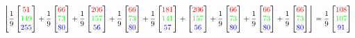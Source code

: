 \documentclass[a4paper, 11pt]{article}
\begin{document}
$$
\left\lfloor
\frac{1}{9}
\begin{bmatrix}
    \textcolor{red}{51} \\ \textcolor{green}{149} \\ \textcolor{blue}{255}
\end{bmatrix}+
\frac{1}{9}
\begin{bmatrix}
    \textcolor{red}{66} \\ \textcolor{green}{73} \\ \textcolor{blue}{80}
\end{bmatrix} +
\frac{1}{9}
\begin{bmatrix}
    \textcolor{red}{206} \\ \textcolor{green}{157} \\ \textcolor{blue}{56}
\end{bmatrix} +
\frac{1}{9}
\begin{bmatrix}
    \textcolor{red}{66} \\ \textcolor{green}{73} \\ \textcolor{blue}{80}
\end{bmatrix} +
\frac{1}{9}
\begin{bmatrix}
    \textcolor{red}{181} \\ \textcolor{green}{141} \\ \textcolor{blue}{57}
\end{bmatrix} +
\begin{bmatrix}
    \textcolor{red}{206} \\ \textcolor{green}{157} \\ \textcolor{blue}{56}
\end{bmatrix} +
\frac{1}{9}
\begin{bmatrix}
    \textcolor{red}{66} \\ \textcolor{green}{73} \\ \textcolor{blue}{80}
\end{bmatrix} +
\frac{1}{9}
\begin{bmatrix}
    \textcolor{red}{66} \\ \textcolor{green}{73} \\ \textcolor{blue}{80}
\end{bmatrix} +
\frac{1}{9}
\begin{bmatrix}
    \textcolor{red}{66} \\ \textcolor{green}{73} \\ \textcolor{blue}{80}
\end{bmatrix}
\right\rfloor = 
\frac{1}{9}
\begin{bmatrix}
    \textcolor{red}{108} \\ \textcolor{green}{107} \\ \textcolor{blue}{91}
\end{bmatrix}
$$
\end{document}
